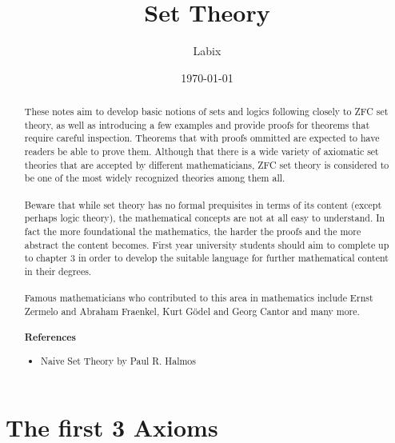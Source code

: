 \documentclass[a4paper]{article}
\title{Set Theory}
\author{Labix}
\date{\today}
\begin{document}
\maketitle
\begin{abstract}
These notes aim to develop basic notions of sets and logics following closely to ZFC set theory, as well as introducing a few examples and provide proofs for theorems that require careful inspection. Theorems that with proofs ommitted are expected to have readers be able to prove them. Although that there is a wide variety of axiomatic set theories that are accepted by different mathematicians, ZFC set theory is considered to be one of the most widely recognized theories among them all. \\~\\

Beware that while set theory has no formal prequisites in terms of its content (except perhaps logic theory), the mathematical concepts are not at all easy to understand. In fact the more foundational the mathematics, the harder the proofs and the more abstract the content becomes. First year university students should aim to complete up to chapter $3$ in order to develop the suitable language for further mathematical content in their degrees. \\~\\

Famous mathematicians who contributed to this area in mathematics include Ernst Zermelo and Abraham Fraenkel, Kurt Gödel and Georg Cantor and many more. \\~\\
\textbf{References}
\begin{itemize}
\item Naive Set Theory by Paul R. Halmos
\end{itemize}
\end{abstract}
\pagebreak
\tableofcontents
\pagebreak

\section{The first 3 Axioms}
\end{document}
